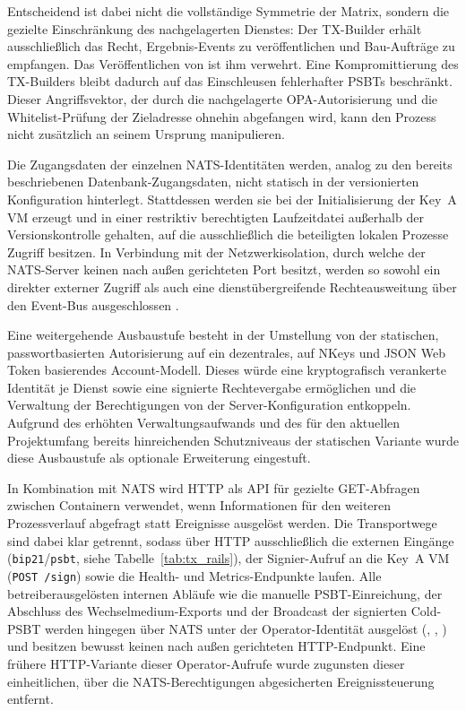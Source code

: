 Entscheidend ist dabei nicht die vollständige Symmetrie der Matrix, sondern die gezielte Einschränkung des nachgelagerten Dienstes: Der TX-Builder erhält ausschließlich das Recht, Ergebnis-Events zu veröffentlichen und Bau-Aufträge zu empfangen. Das Veröffentlichen von \texttt{} ist ihm verwehrt. Eine Kompromittierung des TX-Builders bleibt dadurch auf das Einschleusen fehlerhafter \acp{PSBT} beschränkt. Dieser Angriffsvektor, der durch die nachgelagerte \ac{OPA}-Autorisierung und die Whitelist-Prüfung der Zieladresse ohnehin abgefangen wird, kann den Prozess nicht zusätzlich an seinem Ursprung manipulieren.

Die Zugangsdaten der einzelnen \ac{NATS}-Identitäten werden, analog zu den bereits beschriebenen Datenbank-Zugangsdaten, nicht statisch in der versionierten Konfiguration hinterlegt. Stattdessen werden sie bei der Initialisierung der Key~A \ac{VM} erzeugt und in einer restriktiv berechtigten Laufzeitdatei außerhalb der Versionskontrolle gehalten, auf die ausschließlich die beteiligten lokalen Prozesse Zugriff besitzen. In Verbindung mit der Netzwerkisolation, durch welche der \ac{NATS}-Server keinen nach außen gerichteten Port besitzt, werden so sowohl ein direkter externer Zugriff als auch eine dienstübergreifende Rechteausweitung über den Event-Bus ausgeschlossen \cite{NATS_Auth}.

Eine weitergehende Ausbaustufe besteht in der Umstellung von der statischen, passwortbasierten Autorisierung auf ein dezentrales, auf NKeys und JSON Web Token basierendes Account-Modell. Dieses würde eine kryptografisch verankerte Identität je Dienst sowie eine signierte Rechtevergabe ermöglichen und die Verwaltung der Berechtigungen von der Server-Konfiguration entkoppeln. Aufgrund des erhöhten Verwaltungsaufwands und des für den aktuellen Projektumfang bereits hinreichenden Schutzniveaus der statischen Variante wurde diese Ausbaustufe als optionale Erweiterung eingestuft.

In Kombination mit \ac{NATS} wird \ac{HTTP} als \ac{API} für gezielte GET-Abfragen zwischen Containern verwendet, wenn Informationen für den weiteren Prozessverlauf abgefragt statt Ereignisse ausgelöst werden. Die Transportwege sind dabei klar getrennt, sodass über \ac{HTTP} ausschließlich die externen Eingänge (\texttt{bip21}/\texttt{psbt}, siehe Tabelle~\ref{tab:tx_rails}), der Signier-Aufruf an die Key~A \ac{VM} (\texttt{POST /sign}) sowie die Health- und Metrics-Endpunkte laufen. Alle betreiberausgelösten internen Abläufe wie die manuelle \ac{PSBT}-Einreichung, der Abschluss des Wechselmedium-Exports und der Broadcast der signierten Cold-\ac{PSBT} werden hingegen über \ac{NATS} unter der Operator-Identität ausgelöst (\texttt{}, \texttt{}, \texttt{}) und besitzen bewusst keinen nach außen gerichteten \ac{HTTP}-Endpunkt. Eine frühere \ac{HTTP}-Variante dieser Operator-Aufrufe wurde zugunsten dieser einheitlichen, über die \ac{NATS}-Berechtigungen abgesicherten Ereignissteuerung entfernt.

